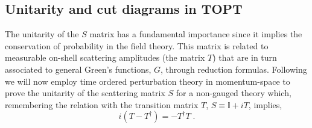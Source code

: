 \documentclass[%
 reprint,
 amsmath,amssymb,
 aps,
]{revtex4-1}
\begin{document}
\subsection{Unitarity and cut diagrams in TOPT}

The unitarity of the $S$ matrix has a fundamental importance since it implies the conservation of probability in the field theory. This matrix is related to measurable on-shell scattering amplitudes (the matrix $T$) that are in turn associated to general Green's functions, $G$, through reduction formulas. 
Following \cite{QFTSterman} we will now employ time ordered perturbation theory in momentum-space to prove the unitarity of the scattering matrix $S$ for a non-gauged theory which, remembering the relation with the transition matrix $T$, $S\equiv \mathbb{I}+iT$, implies,
\begin{equation}
i(T-T^\dagger)=-T^\dagger T\;.\label{Tmat}
\end{equation}
\end{document}
